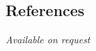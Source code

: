 \documentclass[margin,line]{resume}
\begin{document}
\begin{resume}
    \section{\mysidestyle References} 
    {\sl Available on request}

\end{resume}
\end{document}
